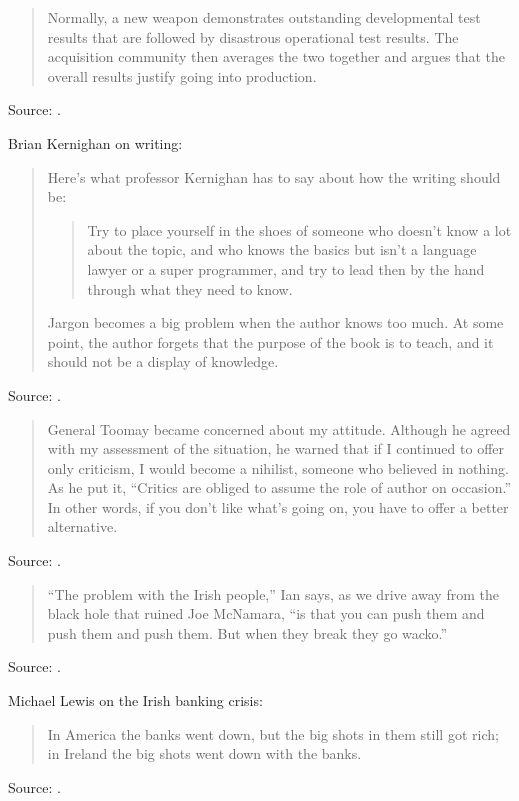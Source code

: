 \documentclass[a4paper]{article}
\begin{document}
\begin{quote}
Normally, a new weapon demonstrates outstanding developmental
test results that are followed by disastrous operational test
results.  The acquisition community then averages the two
together and argues that the overall results justify going
into production.
\end{quote}
Source: \citet[p.~113]{Burton1993}.
\medskip

Brian Kernighan on writing:
\begin{quote}
	Here's what professor Kernighan has to say about how the writing should be:

	\begin{quotation}
		Try to place yourself in the shoes of someone who doesn't know a lot
		about the topic, and who knows the basics but isn't a language lawyer
		or a super programmer, and try to lead then by the hand through what
		they need to know.
	\end{quotation}

	Jargon becomes a big problem when the author knows too much. At some
	point, the author forgets that the purpose of the book is to teach,
	and it should not be a display of knowledge.
\end{quote}
Source: \citet{Noagbodji2011a}.
\medskip

\begin{quote}
	General Toomay became concerned about my attitude.  Although he
	agreed with my assessment of the situation, he warned that if I
	continued to offer only criticism, I would become a nihilist,
	someone who believed in nothing.  As he put it, ``Critics are
	obliged to assume the role of author on occasion.''  In other
	words, if you don't like what's going on, you have to offer a
	better alternative.
\end{quote}
Source: \citet[pp.~56--57]{Burton1993}.
\medskip

\begin{quote}
	``The problem with the Irish people,'' Ian says, as we drive away
	from the black hole that ruined Joe McNamara, ``is that you can
	push them and push them and push them. But when they break they go
	wacko.''
\end{quote}
Source: \citet{Lewis2011a}.
\medskip

Michael Lewis on the Irish banking crisis:
\begin{quote}
	In America the banks went down, but the big shots in them
	still got rich; in Ireland the big shots went down with the banks.
\end{quote}
Source: \citet{Lewis2011a}.
\medskip
\end{document}
